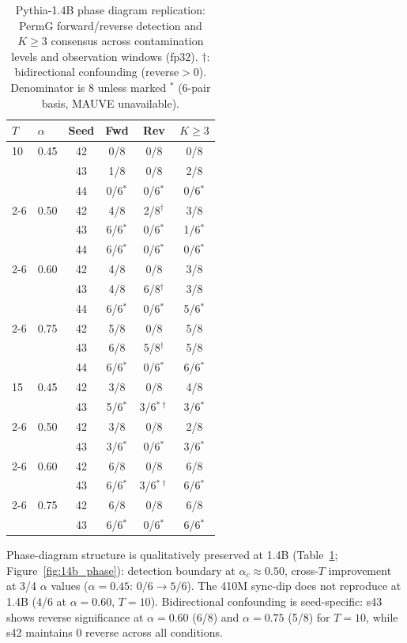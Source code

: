 \begin{table}[H]
\centering
\small
\caption{Pythia-1.4B phase diagram replication: PermG forward/reverse detection and $K{\geq}3$ consensus across contamination levels and observation windows (fp32). $\dagger$: bidirectional confounding (reverse${}>0$). Denominator is 8 unless marked $^{*}$ (6-pair basis, MAUVE unavailable).}
\label{tab:14b_phase}
\begin{tabular}{@{}llcccc@{}}
\toprule
$T$ & $\alpha$ & Seed & Fwd & Rev & $K{\geq}3$ \\
\midrule
10 & 0.45 & 42 & 0/8 & 0/8 & 0/8 \\
   &      & 43 & 1/8 & 0/8 & 2/8 \\
   &      & 44 & 0/6$^{*}$ & 0/6$^{*}$ & 0/6$^{*}$ \\
\cmidrule(l){2-6}
   & 0.50 & 42 & 4/8 & 2/8$^{\dagger}$ & 3/8 \\
   &      & 43 & 6/6$^{*}$ & 0/6$^{*}$ & 1/6$^{*}$ \\
   &      & 44 & 6/6$^{*}$ & 0/6$^{*}$ & 0/6$^{*}$ \\
\cmidrule(l){2-6}
   & 0.60 & 42 & 4/8 & 0/8 & 3/8 \\
   &      & 43 & 4/8 & 6/8$^{\dagger}$ & 3/8 \\
   &      & 44 & 6/6$^{*}$ & 0/6$^{*}$ & 5/6$^{*}$ \\
\cmidrule(l){2-6}
   & 0.75 & 42 & 5/8 & 0/8 & 5/8 \\
   &      & 43 & 6/8 & 5/8$^{\dagger}$ & 5/8 \\
   &      & 44 & 6/6$^{*}$ & 0/6$^{*}$ & 6/6$^{*}$ \\
\midrule
15 & 0.45 & 42 & 3/8 & 0/8 & 4/8 \\
   &      & 43 & 5/6$^{*}$ & 3/6$^{*\dagger}$ & 3/6$^{*}$ \\
\cmidrule(l){2-6}
   & 0.50 & 42 & 3/8 & 0/8 & 2/8 \\
   &      & 43 & 3/6$^{*}$ & 0/6$^{*}$ & 3/6$^{*}$ \\
\cmidrule(l){2-6}
   & 0.60 & 42 & 6/8 & 0/8 & 6/8 \\
   &      & 43 & 6/6$^{*}$ & 3/6$^{*\dagger}$ & 6/6$^{*}$ \\
\cmidrule(l){2-6}
   & 0.75 & 42 & 6/8 & 0/8 & 6/8 \\
   &      & 43 & 6/6$^{*}$ & 0/6$^{*}$ & 6/6$^{*}$ \\
\bottomrule
\end{tabular}
\end{table}

Phase-diagram structure is qualitatively preserved at 1.4B (Table~\ref{tab:14b_phase}; Figure~\ref{fig:14b_phase}): detection boundary at $\alpha_c{\approx}0.50$, cross-$T$ improvement at 3/4 $\alpha$ values ($\alpha{=}0.45$: $0/6{\to}5/6$).
The 410M sync-dip does not reproduce at 1.4B (4/6 at $\alpha{=}0.60$, $T{=}10$).
Bidirectional confounding is seed-specific: s43 shows reverse significance at $\alpha{=}0.60$ (6/8) and $\alpha{=}0.75$ (5/8) for $T{=}10$, while s42 maintains 0 reverse across all conditions.

